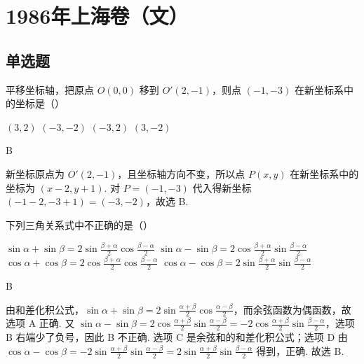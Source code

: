 \documentclass[UTF8,a4paper,oneside,11pt]{ctexbook}
\begin{document}
\mainmatter

\chapter{1986年上海卷（文）}

\section{单选题}

\begin{problem}

平移坐标轴，把原点 \(O(0,0)\) 移到 \(O'(2,-1)\)，则点 \((-1,-3)\) 在新坐标系中的坐标是（\quad）

\choices
    {\(\left( 3,2 \right)\)}
    {\(\left( -3,-2 \right)\)}
    {\(\left( -3,2 \right)\)}
    {\(\left( 3,-2 \right)\)}
\end{problem}

\begin{answer}
B
\end{answer}

\begin{solution}
新坐标原点为 \(O'(2,-1)\)，且坐标轴方向不变，所以点 \(P(x,y)\) 在新坐标系中的坐标为 \((x-2,y+1)\). 对 \(P=(-1,-3)\) 代入得新坐标 \((-1-2,-3+1)=(-3,-2)\)，故选 B.
\end{solution}

\begin{problem}

下列三角关系式中不正确的是（\quad）

\choices
    {\(\sin\alpha+\sin\beta=2\sin\frac{\beta+\alpha}{2}\cos\frac{\beta-\alpha}{2} \)}
    {\(\sin\alpha-\sin\beta=2\cos\frac{\beta+\alpha}{2}\sin\frac{\beta-\alpha}{2} \)}
    {\(\cos \alpha + \cos \beta = 2\cos \frac{\beta + \alpha}{2}\cos \frac{\beta - \alpha}{2}\)}
    {\(\cos \alpha - \cos \beta = 2\sin \frac{\beta + \alpha}{2}\sin \frac{\beta - \alpha}{2}\)}
\end{problem}

\begin{answer}
B
\end{answer}

\begin{solution}
由和差化积公式，\(\sin\alpha+\sin\beta=2\sin\frac{\alpha+\beta}{2}\cos\frac{\alpha-\beta}{2}\)，而余弦函数为偶函数，故选项 A 正确. 又 \(\sin\alpha-\sin\beta=2\cos\frac{\alpha+\beta}{2}\sin\frac{\alpha-\beta}{2}=-2\cos\frac{\alpha+\beta}{2}\sin\frac{\beta-\alpha}{2}\)，选项 B 右端少了负号，因此 B 不正确. 选项 C 是余弦和的和差化积公式；选项 D 由 \(\cos\alpha-\cos\beta=-2\sin\frac{\alpha+\beta}{2}\sin\frac{\alpha-\beta}{2}=2\sin\frac{\alpha+\beta}{2}\sin\frac{\beta-\alpha}{2}\) 得到，正确. 故选 B.
\end{solution}
\end{document}
